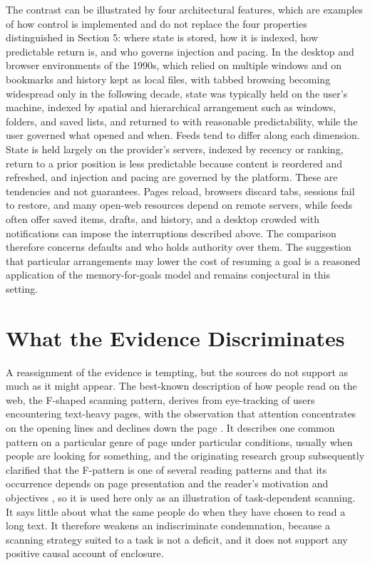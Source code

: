 \documentclass[12pt]{article}
\begin{document}
The contrast can be illustrated by four architectural features, which are examples of how control is implemented and do not replace the four properties distinguished in Section 5: where state is stored, how it is indexed, how predictable return is, and who governs injection and pacing. In the desktop and browser environments of the 1990s, which relied on multiple windows and on bookmarks and history kept as local files, with tabbed browsing becoming widespread only in the following decade, state was typically held on the user's machine, indexed by spatial and hierarchical arrangement such as windows, folders, and saved lists, and returned to with reasonable predictability, while the user governed what opened and when. Feeds tend to differ along each dimension. State is held largely on the provider's servers, indexed by recency or ranking, return to a prior position is less predictable because content is reordered and refreshed, and injection and pacing are governed by the platform. These are tendencies and not guarantees. Pages reload, browsers discard tabs, sessions fail to restore, and many open-web resources depend on remote servers, while feeds often offer saved items, drafts, and history, and a desktop crowded with notifications can impose the interruptions described above. The comparison therefore concerns defaults and who holds authority over them. The suggestion that particular arrangements may lower the cost of resuming a goal is a reasoned application of the memory-for-goals model and remains conjectural in this setting.

\section{What the Evidence Discriminates}

A reassignment of the evidence is tempting, but the sources do not support as much as it might appear. The best-known description of how people read on the web, the F-shaped scanning pattern, derives from eye-tracking of users encountering text-heavy pages, with the observation that attention concentrates on the opening lines and declines down the page \cite{nielsen2006f}. It describes one common pattern on a particular genre of page under particular conditions, usually when people are looking for something, and the originating research group subsequently clarified that the F-pattern is one of several reading patterns and that its occurrence depends on page presentation and the reader's motivation and objectives \cite{pernice2017f}, so it is used here only as an illustration of task-dependent scanning. It says little about what the same people do when they have chosen to read a long text. It therefore weakens an indiscriminate condemnation, because a scanning strategy suited to a task is not a deficit, and it does not support any positive causal account of enclosure.
\end{document}
